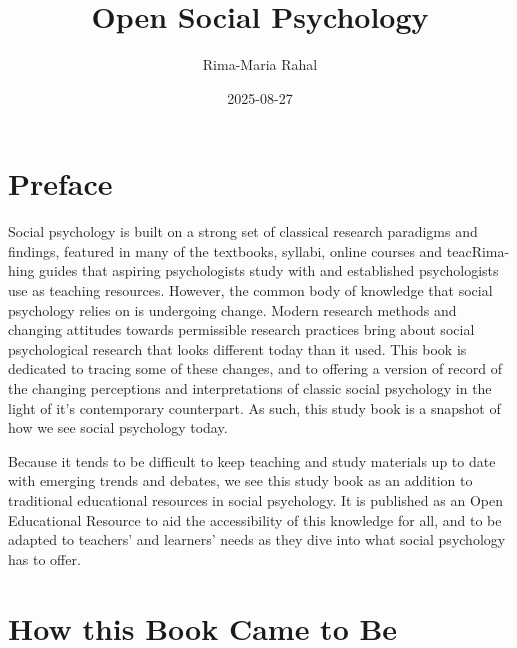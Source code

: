 \documentclass[
  letterpaper,
]{book}
\title{Open Social Psychology}
\author{Rima-Maria Rahal}
\date{2025-08-27}
\renewcommand*\contentsname{Table of contents}
\newcommand\contentsname{Table of contents}
\begin{document}
\frontmatter
\maketitle

\renewcommand*\contentsname{Table of contents}
{
\hypersetup{linkcolor=}
\setcounter{tocdepth}{2}
\tableofcontents
}
\mainmatter
{}

\chapter*{\texorpdfstring{{Preface}}{Preface}}\label{preface}


Social psychology is built on a strong set of classical research
paradigms and findings, featured in many of the textbooks, syllabi,
online courses and teacRima-hing guides that aspiring psychologists
study with and established psychologists use as teaching resources.
However, the common body of knowledge that social psychology relies on
is undergoing change. Modern research methods and changing attitudes
towards permissible research practices bring about social psychological
research that looks different today than it used. This book is dedicated
to tracing some of these changes, and to offering a version of record of
the changing perceptions and interpretations of classic social
psychology in the light of it's contemporary counterpart. As such, this
study book is a snapshot of how we see social psychology today.

Because it tends to be difficult to keep teaching and study materials up
to date with emerging trends and debates, we see this study book as an
addition to traditional educational resources in social psychology. It
is published as an Open Educational Resource to aid the accessibility of
this knowledge for all, and to be adapted to teachers' and learners'
needs as they dive into what social psychology has to offer.


\chapter*{\texorpdfstring{{How this Book Came to
Be}}{How this Book Came to Be}}\label{how-this-book-came-to-be}

\end{document}
